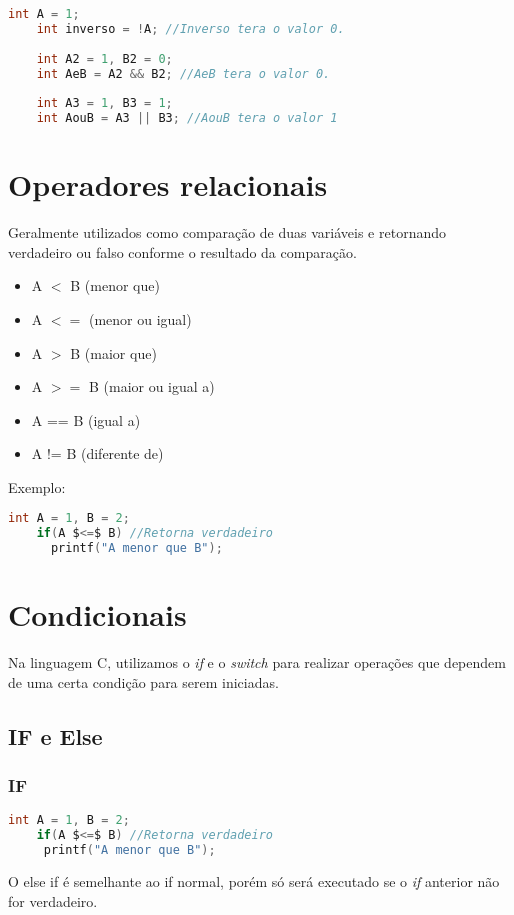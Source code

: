 \documentclass[12pt]{article}
\begin{document}
\begin{lstlisting}[language=C]
	int A = 1;
	int inverso = !A; //Inverso tera o valor 0.
	
	int A2 = 1, B2 = 0;
	int AeB = A2 && B2; //AeB tera o valor 0.
	
	int A3 = 1, B3 = 1;
	int AouB = A3 || B3; //AouB tera o valor 1
\end{lstlisting}

\section{Operadores relacionais}
Geralmente utilizados como comparação de duas variáveis e retornando verdadeiro ou falso conforme o resultado da comparação.

\begin{itemize}
	\item A $<$ B (menor que)
	\item A $<=$ (menor ou igual)
	\item A $>$ B (maior que)
	\item A $>=$ B (maior ou igual a)
	\item A == B (igual a)
	\item A != B (diferente de)
	
\end{itemize}
Exemplo:
\begin{lstlisting}[language=C,mathescape=true]
	int A = 1, B = 2;
	if(A $<=$ B) //Retorna verdadeiro
	  printf("A menor que B");
\end{lstlisting}

\newpage
\section{Condicionais}

Na linguagem C, utilizamos o \textit{if} e o \textit{switch} para realizar operações que dependem de uma certa condição para serem iniciadas.

\subsection{IF e Else}
\subsubsection{IF}
\begin{lstlisting}[language=C,mathescape=true]
	int A = 1, B = 2;
	if(A $<=$ B) //Retorna verdadeiro
	 printf("A menor que B");
\end{lstlisting}
O else if é semelhante ao if normal, porém só será executado se o \textit{if} anterior não for verdadeiro.
\end{document}
